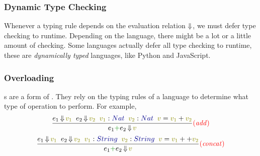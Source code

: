 \subsubsection{Dynamic Type Checking}\label{subsubsec:Dynamic_Type_Checking}
Whenever a typing rule depends on the evaluation relation $\operatorname{\Downarrow}$, we must defer type checking to runtime.
Depending on the language, there might be a lot or a little amount of checking.
Some languages actually defer all type checking to runtime, these are \emph{dynamically typed} languages, like Python and JavaScript.

\subsubsection{Overloading}\label{subsubsec:Overloading}
s are a form of .
They rely on the typing rules of a language to determine what type of operation to perform.
For example,
\begin{equation*}
  \dfrac{e_{1} \EvaluatesTo \SemanticValue{v_{1}} \;\; e_{2} \EvaluatesTo \SemanticValue{v_{2}} \;\; \SemanticValue{v_{1}} : \SemanticType{Nat} \;\; \SemanticValue{v_{2}} : \SemanticType{Nat} \;\; \SemanticValue{v} = \SemanticValue{v_{1}} + \SemanticValue{v_{2}}}{e_{1} \SemanticInput{+} e_{2} \EvaluatesTo \SemanticValue{v}}\SemanticRuleName{add}
\end{equation*}
\begin{equation*}
  \dfrac{e_{1} \EvaluatesTo \SemanticValue{v_{1}} \;\; e_{2} \EvaluatesTo \SemanticValue{v_{2}} \;\; \SemanticValue{v_{1}} : \SemanticType{String} \;\; \SemanticValue{v_{2}} : \SemanticType{String} \;\; \SemanticValue{v} = \SemanticValue{v_{1}} ++ \SemanticValue{v_{2}}}{e_{1} \SemanticInput{+} e_{2} \EvaluatesTo \SemanticValue{v}}\SemanticRuleName{concat}
\end{equation*}


